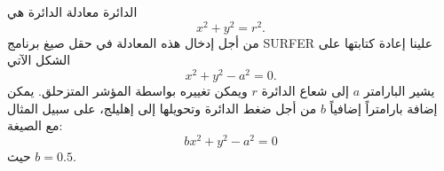 \begin{surferPage}[دائرة]{الدائرة}
معادلة الدائرة هي
\[x^2+y^2=r^2.\]
من أجل إدخال هذه المعادلة في حقل صيغ برنامج \textenglish{SURFER} علينا إعادة كتابتها على الشكل الآتي
\[x^2+y^2-a^2=0.\]
يشير البارامتر $a$ إلى شعاع الدائرة $r$ ويمكن تغييره بواسطة المؤشر المتزحلق. يمكن إضافة بارامتراً إضافياً $ b $ من أجل ضغط الدائرة وتحويلها إلى إهليلج، على سبيل المثال مع الصيغة:
\[bx^2+y^2-a^2=0\] حيث $b=0.5$.
\end{surferPage}
